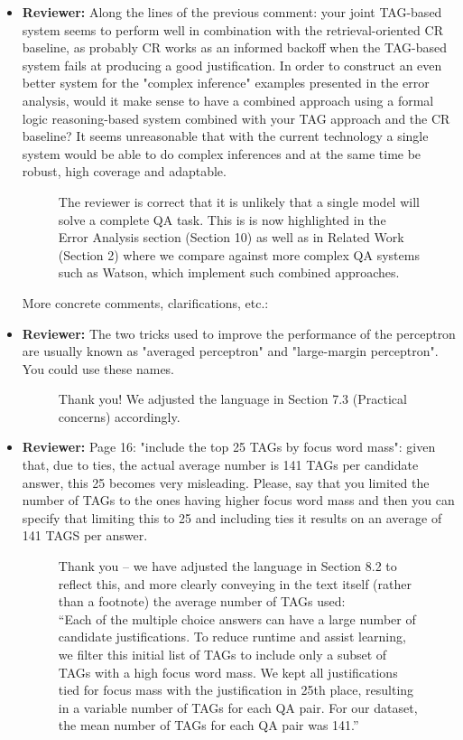 \documentclass[10pt]{article}
\begin{document}
\begin{itemize}
\item \textbf{Reviewer:} Along the lines of the previous comment: your joint TAG-based system seems
to perform well in combination with the retrieval-oriented CR baseline, as
probably CR works as an informed backoff when the TAG-based system fails at
producing a good justification. In order to construct an even better system
for the "complex inference" examples presented in the error analysis, would
it make sense to have a combined approach using a formal logic
reasoning-based system combined with your TAG approach and the CR baseline?
It seems unreasonable that with the current technology a single system would
be able to do complex inferences and at the same time be robust, high
coverage and adaptable.

\begin{figure}[H]
\caption{The reviewer is correct that it is unlikely that a single model will solve a complete QA task. This is is now highlighted in the Error Analysis section (Section 10) as well as in Related Work (Section 2) where we compare against more complex QA systems such as Watson, which implement such combined approaches.}
\end{figure}


More concrete comments, clarifications, etc.:

\item \textbf{Reviewer:} The two tricks used to improve the performance of the perceptron are
usually known as "averaged perceptron" and "large-margin perceptron". You
could use these names.

\begin{figure}[H]
\caption{ Thank you! We adjusted the language in Section 7.3 (Practical concerns) accordingly.}
\end{figure}

\item \textbf{Reviewer:} Page 16: "include the top 25 TAGs by focus word mass": given that, due to
ties, the actual average number is 141 TAGs per candidate answer, this 25
becomes very misleading. Please, say that you limited the number of TAGs to
the ones having higher focus word mass and then you can specify that
limiting this to 25 and including ties it results on an average of 141 TAGS
per answer.

\begin{figure}[H]
\caption{ Thank you -- we have adjusted the language in Section 8.2 to reflect this, and more clearly conveying in the text itself (rather than a footnote) the average number of TAGs used: 
\\ 
``Each of the multiple choice answers can have a large number of candidate justifications.  To reduce runtime and assist learning, we filter this initial list of TAGs to include only a subset of TAGs with a high focus word mass. We kept all justifications tied for focus mass with the justification in 25th place, resulting in a variable number of TAGs for each QA pair.  For our dataset, the mean number of TAGs for each QA pair was 141.'' }
\end{figure}



\end{itemize}
\end{document}
